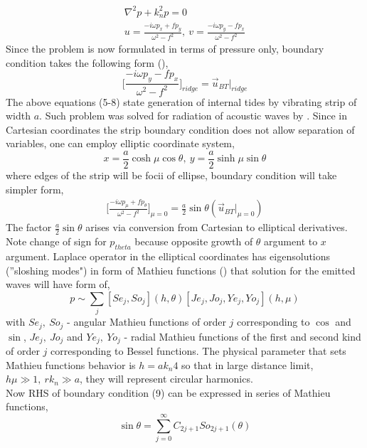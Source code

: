 \begin{align}
\nabla^2 p + k_n^2 p = 0\\
u = \frac{-i \omega p_x + f p_y}{\omega^2 - f^2},~v = \frac{-i \omega p_y - f p_x}{\omega^2 - f^2}
\end{align}
Since the problem is now formulated in terms of pressure only, boundary condition takes the following form (\cite{greenspan1968theory}),
\begin{equation}
\Big[ \frac{-i \omega p_y - f p_x}{\omega^2 - f^2} \Big]_{ridge} = \vec{u}_{BT}|_{ridge}
\end{equation}
The above equations (5-8) state generation of internal tides by vibrating strip of width $a$. Such problem was solved for radiation of acoustic waves by \cite{morse1946methods}. Since in Cartesian coordinates the strip boundary condition does not allow separation of variables, one can employ elliptic coordinate system,
\begin{equation*}
x = \frac{a}{2} \cosh \mu \cos \theta,~y = \frac{a}{2} \sinh \mu \sin \theta
\end{equation*}
where edges of the strip will be focii of ellipse, boundary condition will take simpler form,
\begin{align}
\Big[ \frac{-i \omega p_{\mu} + f p_{\theta}}{\omega^2 - f^2} \Big]_{\mu = 0} = \frac{a}{2} \sin \theta (\vec{u}_{BT}|_{\mu = 0})
\end{align}
The factor $\frac{a}{2} \sin \theta$ arises via conversion from Cartesian to elliptical derivatives. Note change of sign for $p_{theta}$ because opposite growth of $\theta$ argument to $x$ argument. Laplace operator in the elliptical coordinates has eigensolutions (''sloshing modes") in form of Mathieu functions (\cite{stratton2007electromagnetic}) that solution for the emitted waves will have form of,
\begin{equation}
p \sim \sum_{j} [Se_j, So_j](h, \theta) [Je_j, Jo_j, Ye_j, Yo_j](h, \mu)
\end{equation}
with $Se_j,~So_j$ - angular Mathieu functions of order $j$ corresponding to $\cos$ and $\sin$, $Je_j,~Jo_j$ and $Ye_j,~Yo_j$ - radial Mathieu functions of the first and second kind of order $j$ corresponding to Bessel functions. The physical parameter that sets Mathieu functions behavior is $h = {a k_n}{4} $ so that in large distance limit, $h \mu \gg 1,~rk_n \gg a$, they will represent circular harmonics.\\
Now RHS of boundary condition (9) can be expressed in series of Mathieu functions,
\begin{equation}
\sin \theta = \sum_{j = 0}^{\infty} C_{2j + 1} So_{2j + 1} (\theta)
\end{equation}
